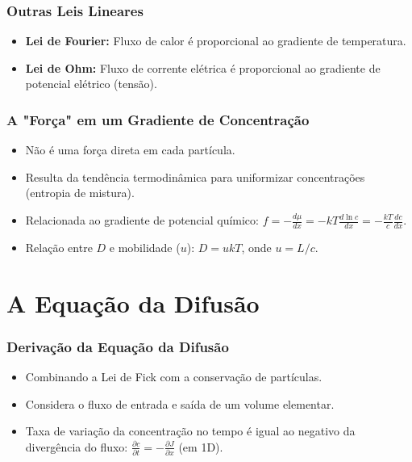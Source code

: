 \documentclass[11pt]{beamer}
\begin{document}
\begin{frame}
    \frametitle{Outras Leis Lineares}
    \begin{itemize}
        \item \textbf{Lei de Fourier:} Fluxo de calor é proporcional ao gradiente de temperatura.
        \item \textbf{Lei de Ohm:} Fluxo de corrente elétrica é proporcional ao gradiente de potencial elétrico (tensão).
    \end{itemize}
\end{frame}

\begin{frame}
    \frametitle{A "Força" em um Gradiente de Concentração}
    \begin{itemize}
        \item Não é uma força direta em cada partícula.
        \item Resulta da tendência termodinâmica para uniformizar concentrações (entropia de mistura).
        \item Relacionada ao gradiente de potencial químico: $f = -\frac{d\mu}{dx} = -kT \frac{d \ln c}{dx} = -\frac{kT}{c}\frac{dc}{dx}$.
        \item Relação entre $D$ e mobilidade ($u$): $D = ukT$, onde $u=L/c$.
    \end{itemize}
\end{frame}

\section{A Equação da Difusão}

\begin{frame}
    \frametitle{Derivação da Equação da Difusão}
    \begin{itemize}
        \item Combinando a Lei de Fick com a conservação de partículas.
        \item Considera o fluxo de entrada e saída de um volume elementar.
        \item Taxa de variação da concentração no tempo é igual ao negativo da divergência do fluxo: $\frac{\partial c}{\partial t} = -\frac{\partial J}{\partial x}$ (em 1D).
    \end{itemize}
\end{frame}
\end{document}
